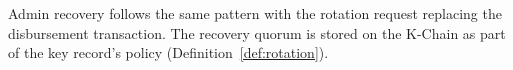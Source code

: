 Admin recovery follows the same pattern with the rotation request replacing the
disbursement transaction. The recovery quorum is stored on the K-Chain as part
of the key record's policy (Definition~\ref{def:rotation}).

